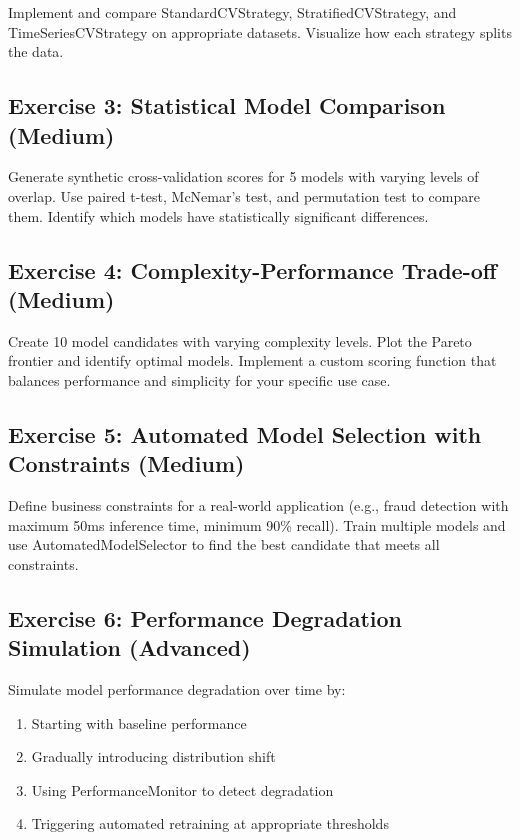 Implement and compare StandardCVStrategy, StratifiedCVStrategy, and TimeSeriesCVStrategy on appropriate datasets. Visualize how each strategy splits the data.

\subsection{Exercise 3: Statistical Model Comparison (Medium)}

Generate synthetic cross-validation scores for 5 models with varying levels of overlap. Use paired t-test, McNemar's test, and permutation test to compare them. Identify which models have statistically significant differences.

\subsection{Exercise 4: Complexity-Performance Trade-off (Medium)}

Create 10 model candidates with varying complexity levels. Plot the Pareto frontier and identify optimal models. Implement a custom scoring function that balances performance and simplicity for your specific use case.

\subsection{Exercise 5: Automated Model Selection with Constraints (Medium)}

Define business constraints for a real-world application (e.g., fraud detection with maximum 50ms inference time, minimum 90\% recall). Train multiple models and use AutomatedModelSelector to find the best candidate that meets all constraints.

\subsection{Exercise 6: Performance Degradation Simulation (Advanced)}

Simulate model performance degradation over time by:
\begin{enumerate}
    \item Starting with baseline performance
    \item Gradually introducing distribution shift
    \item Using PerformanceMonitor to detect degradation
    \item Triggering automated retraining at appropriate thresholds
\end{enumerate}

